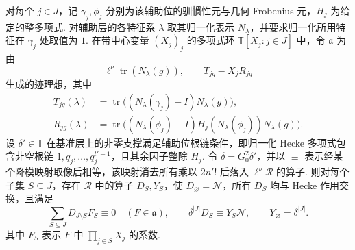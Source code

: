 \begin{lemma}[带辅助位参数的范数算子族]
\label{lem:c-deformed-norm}
\emitthmsource
对每个 $j\in J$，记 $\gamma_j,\phi_j$ 分别为该辅助位的驯惯性元与几何 Frobenius 元，$H_j$ 为给定的整多项式.
对辅助层的各特征系 $\lambda$ 取其归一化表示 $N_\lambda$，并要求归一化所用特征在 $\gamma_j$ 处取值为 $1$.
在带中心变量 $(X_j)_j$ 的多项式环 $\mathbb T[X_j:j\in J]$ 中，令 $\mathfrak a$ 为由
\[
 \ell^\nu\operatorname{tr}(N_\lambda(g)),
 \qquad T_{jg}-X_j R_{jg}
\]
生成的迹理想，其中
\[
\begin{aligned}
 T_{jg}(\lambda)&=\operatorname{tr}\bigl((N_\lambda(\gamma_j)-I)N_\lambda(g)\bigr),\\
 R_{jg}(\lambda)&=\operatorname{tr}\bigl((N_\lambda(\phi_j)-I)
 H_j(N_\lambda(\phi_j))N_\lambda(g)\bigr).
\end{aligned}
\]
设 $\delta'\in\mathbb T$ 在基准层上的非零支撑满足辅助位根链条件，即归一化 Hecke 多项式包含非空根链 $1,q_j,\ldots,q_j^{t'-1}$，且其余因子整除 $H_j$.
令 $\delta=G_0^2\delta'$，并以 $\equiv$ 表示经某个降模映射取像后相等，该映射消去所有乘以 $2n'!$ 后落入 $\ell^\nu\mathcal R$ 的算子.
则对每个子集 $S\subseteq J$，存在 $\mathcal R$ 中的算子 $D_S,Y_S$，使 $D_\varnothing=\mathcal N$，所有 $D_S$ 均与 Hecke 作用交换，且满足
\[
 \sum_{S\subseteq J}D_{J\setminus S}F_S\equiv0\quad(F\in\mathfrak a),
 \qquad
 \delta^{|J|}D_S\equiv Y_S\mathcal N,\qquad
 Y_\varnothing=\delta^{|J|}.
\]
其中 $F_S$ 表示 $F$ 中 $\prod_{j\in S}X_j$ 的系数.
\end{lemma}
